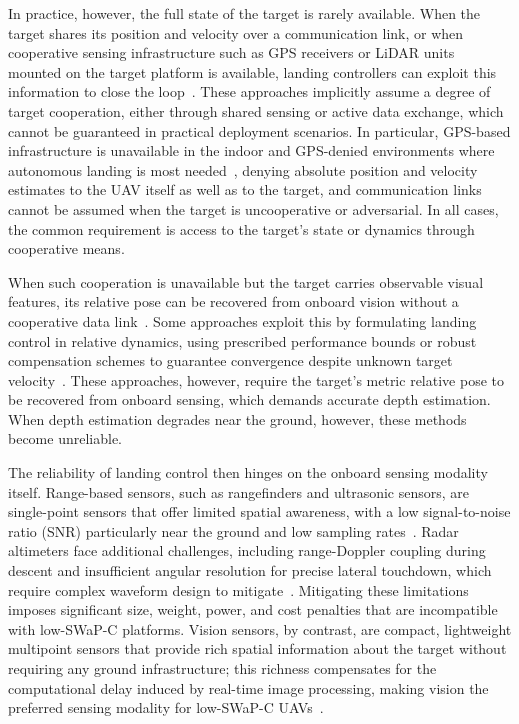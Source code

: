 \documentclass{IEEEtaes}
\begin{document}
In practice, however, the full state of the target is rarely available. When the target shares its position and velocity over a communication link, or when cooperative sensing infrastructure such as GPS receivers or LiDAR units mounted on the target platform is available, landing controllers can exploit this information to close the loop~\cite{marcon2018,isilak2025,bouazza2025,cho2022}. These approaches implicitly assume a degree of target cooperation, either through shared sensing or active data exchange, which cannot be guaranteed in practical deployment scenarios. In particular, GPS-based infrastructure is unavailable in the indoor and GPS-denied environments where autonomous landing is most needed~\cite{bautista2023,niu2022}, denying absolute position and velocity estimates to the UAV itself as well as to the target, and communication links cannot be assumed when the target is uncooperative or adversarial. In all cases, the common requirement is access to the target's state or dynamics through cooperative means.

When such cooperation is unavailable but the target carries observable visual features, its relative pose can be recovered from onboard vision without a cooperative data link~\cite{wenzel2010}. Some approaches exploit this by formulating landing control in relative dynamics, using prescribed performance bounds or robust compensation schemes to guarantee convergence despite unknown target velocity~\cite{lin2022,zhao2021}. These approaches, however, require the target's metric relative pose to be recovered from onboard sensing, which demands accurate depth estimation. When depth estimation degrades near the ground, however, these methods become unreliable.

The reliability of landing control then hinges on the onboard sensing modality itself. Range-based sensors, such as rangefinders and ultrasonic sensors, are single-point sensors that offer limited spatial awareness, with a low signal-to-noise ratio (SNR) particularly near the ground and low sampling rates~\cite{zhao2012}. Radar altimeters face additional challenges, including range-Doppler coupling during descent and insufficient angular resolution for precise lateral touchdown, which require complex waveform design to mitigate~\cite{awan2024,veneruso2025}. Mitigating these limitations imposes significant size, weight, power, and cost penalties that are incompatible with low-SWaP-C platforms. Vision sensors, by contrast, are compact, lightweight multipoint sensors that provide rich spatial information about the target without requiring any ground infrastructure; this richness compensates for the computational delay induced by real-time image processing, making vision the preferred sensing modality for low-SWaP-C UAVs~\cite{semerikov2025,lin2023,angelis2026}.
\end{document}
